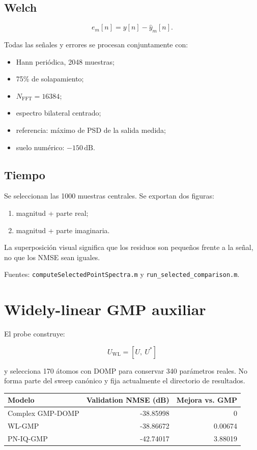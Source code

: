 \documentclass[10pt,a4paper]{article}
\newcommand{\code}[1]{\texttt{#1}}
\begin{document}
\subsection{Welch}

\[
e_m[n]=y[n]-\hat y_m[n].
\]

Todas las señales y errores se procesan conjuntamente con:

\begin{itemize}[leftmargin=*]
\item Hann periódica, 2048 muestras;
\item 75\% de solapamiento;
\item \(N_{\mathrm{FFT}}=16384\);
\item espectro bilateral centrado;
\item referencia: máximo de PSD de la salida medida;
\item suelo numérico: \(-150\,\mathrm{dB}\).
\end{itemize}

\subsection{Tiempo}

Se seleccionan las 1000 muestras centrales. Se exportan dos figuras:

\begin{enumerate}[leftmargin=*]
\item magnitud + parte real;
\item magnitud + parte imaginaria.
\end{enumerate}

La superposición visual significa que los residuos son pequeños frente a la
señal, no que los NMSE sean iguales.

Fuentes:
\code{computeSelectedPointSpectra.m} y
\code{run\_selected\_comparison.m}.

\section{Widely-linear GMP auxiliar}

El probe construye:

\[
U_{\mathrm{WL}}=[U,\ U^*]
\]

y selecciona 170 átomos con DOMP para conservar 340 parámetros reales. No
forma parte del sweep canónico y fija actualmente el directorio de resultados.

\begin{center}
\begin{tabular}{lrr}
\toprule
Modelo & Validation NMSE (dB) & Mejora vs. GMP\\
\midrule
Complex GMP-DOMP & -38.85998 & 0\\
WL-GMP & -38.86672 & 0.00674\\
PN-IQ-GMP & -42.74017 & 3.88019\\
\bottomrule
\end{tabular}
\end{center}
\end{document}
